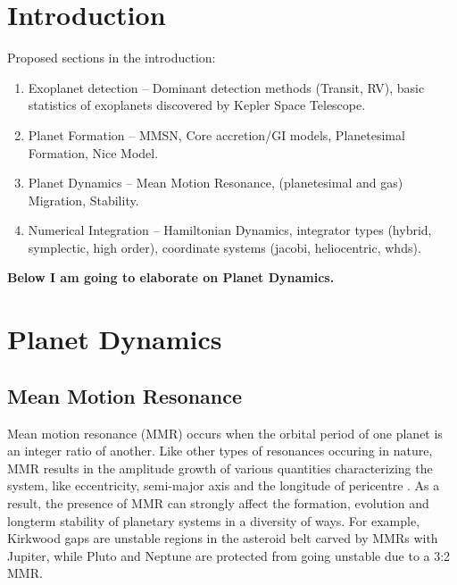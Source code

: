 \documentclass[12pt,letter]{aastex}
\date{Draft version: \today}
\begin{document}
\section{Introduction}

Proposed sections in the introduction:
\begin{enumerate}
\item Exoplanet detection -- Dominant detection methods (Transit, RV), basic statistics of exoplanets discovered by Kepler Space Telescope.
\item Planet Formation -- MMSN, Core accretion/GI models, Planetesimal Formation, Nice Model. 
\item Planet Dynamics -- Mean Motion Resonance, (planetesimal and gas) Migration, Stability.
\item Numerical Integration -- Hamiltonian Dynamics, integrator types (hybrid, symplectic, high order), coordinate systems (jacobi, heliocentric, whds).
\end{enumerate}

\textbf{Below I am going to elaborate on Planet Dynamics. }

\section{Planet Dynamics}
\subsection{Mean Motion Resonance}
\label{sec:MMR}
Mean motion resonance (MMR) occurs when the orbital period of one planet is an integer ratio of another. 
Like other types of resonances occuring in nature, MMR results in the amplitude growth of various quantities characterizing the system, like eccentricity, semi-major axis and the longitude of pericentre \citep{SSD1999}. 
As a result, the presence of MMR can strongly affect the formation, evolution and longterm stability of planetary systems in a diversity of ways.
For example, Kirkwood gaps are unstable regions in the asteroid belt carved by MMRs with Jupiter, while Pluto and Neptune are protected from going unstable due to a 3:2 MMR. 
\end{document}
